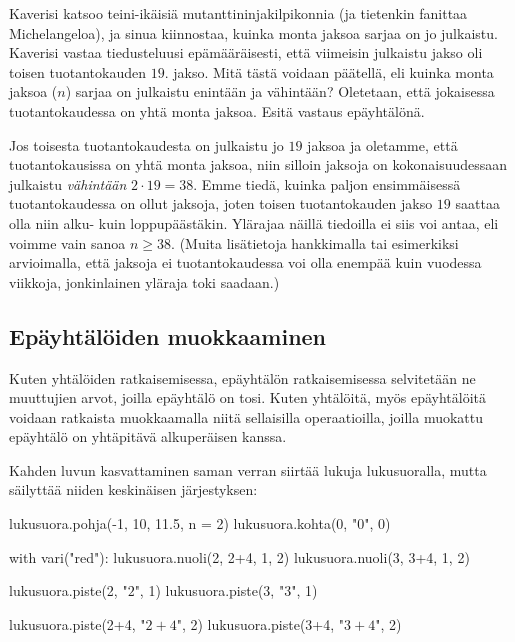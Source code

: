 \begin{esimerkki}
Kaverisi katsoo teini-ikäisiä mutanttininjakilpikonnia (ja tietenkin fanittaa Michelangeloa), ja sinua kiinnostaa, kuinka monta jaksoa sarjaa on jo julkaistu. Kaverisi vastaa tiedusteluusi epämääräisesti, että viimeisin julkaistu jakso oli toisen tuotantokauden $19$. jakso. Mitä tästä voidaan päätellä, eli kuinka monta jaksoa ($n$) sarjaa on julkaistu enintään ja vähintään? Oletetaan, että jokaisessa tuotantokaudessa on yhtä monta jaksoa. Esitä vastaus epäyhtälönä.
	\begin{esimratk}
	Jos toisesta tuotantokaudesta on julkaistu jo $19$ jaksoa ja oletamme, että tuotantokausissa on yhtä monta jaksoa, niin silloin jaksoja on kokonaisuudessaan julkaistu \textit{vähintään} $2\cdot 19 = 38$. Emme tiedä, kuinka paljon ensimmäisessä tuotantokaudessa on ollut jaksoja, joten toisen tuotantokauden jakso $19$ saattaa olla niin alku- kuin loppupäästäkin. Ylärajaa näillä tiedoilla ei siis voi antaa, eli voimme vain sanoa $n\geq38$. (Muita lisätietoja hankkimalla tai esimerkiksi arvioimalla, että jaksoja ei tuotantokaudessa voi olla enempää kuin vuodessa viikkoja, jonkinlainen yläraja toki saadaan.)
	\end{esimratk}
\end{esimerkki}

\subsection{Epäyhtälöiden muokkaaminen}

Kuten yhtälöiden ratkaisemisessa, epäyhtälön ratkaisemisessa selvitetään ne muuttujien arvot, joilla epäyhtälö on tosi. Kuten yhtälöitä, myös epäyhtälöitä voidaan ratkaista muokkaamalla niitä sellaisilla operaatioilla, joilla muokattu epäyhtälö on yhtäpitävä alkuperäisen kanssa.

Kahden luvun kasvattaminen saman verran siirtää lukuja lukusuoralla, mutta säilyttää niiden keskinäisen järjestyksen:

\begin{kuva}
lukusuora.pohja(-1, 10, 11.5, n = 2)
lukusuora.kohta(0, "$0$", 0)

with vari("red"):
	lukusuora.nuoli(2, 2+4, 1, 2)
	lukusuora.nuoli(3, 3+4, 1, 2)

lukusuora.piste(2, "$2$", 1)
lukusuora.piste(3, "$3$", 1)

lukusuora.piste(2+4, "$2\!+\!4$", 2)
lukusuora.piste(3+4, "$3\!+\!4$", 2)
\end{kuva}

